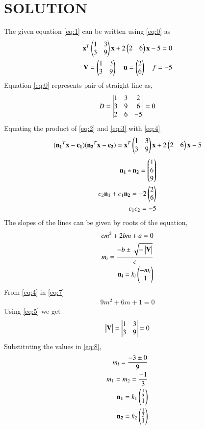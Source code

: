 \documentclass[journal,12pt,twocolumn]{IEEEtran}
\begin{document}
\section{SOLUTION}
The given equation \eqref{eq:1} can be written using \eqref{eq:0} as
\begin{align}
\mathbf{x}^T\begin{pmatrix}1 & 3 \\ 3 & 9\end{pmatrix}\mathbf{x} +2\begin{pmatrix}2 &6\end{pmatrix}\mathbf{x}-5=0\label{eq:4}\\
\mathbf{V} = \begin{pmatrix}1 & 3 \\ 3 & 9\end{pmatrix} \quad \mathbf{u} = \begin{pmatrix}2 \\ 6\end{pmatrix} \quad f= -5 \label{eq:5}
\end{align}
Equation \eqref{eq:0} represents pair of straight line as,
\begin{align}
D = \begin{vmatrix}1&3&2\\3&9&6\\2&6&-5\end{vmatrix} = 0
\end{align}
Equating the product of \eqref{eq:2} and \eqref{eq:3} with \eqref{eq:4}
\begin{align}
(\mathbf{n_1}^T\mathbf{x} -\mathbf{c_1})(\mathbf{n_2}^T\mathbf{x} - \mathbf{c_2})= \mathbf{x}^T\begin{pmatrix}1 & 3 \\ 3 & 9\end{pmatrix}\mathbf{x} +2\begin{pmatrix}2 &6\end{pmatrix}\mathbf{x}-5
\end{align}
\begin{align}
\mathbf{n_1}*\mathbf{n_2}=\begin{pmatrix}1\\6\\9\end{pmatrix}\label{eq:6}\\
c_2\mathbf{n_1}+c_1\mathbf{n_2} = -2\begin{pmatrix}2\\6\end{pmatrix}\\
c_1c_2 = -5
\end{align}
The slopes of the lines can be given by roots of the equation,
\begin{align} 
cm^2+2bm+a=0 \label{eq:7}\\
m_i = \frac{-b\pm \sqrt{-\begin{vmatrix}\mathbf{V}\end{vmatrix}}}{c}\label{eq:8}\\
\mathbf{n_i}=k_i\begin{pmatrix}-m_i\\1\end{pmatrix}
\end{align}
From \eqref{eq:4} in \eqref{eq:7}
\begin{align}
9m^2+6m+1=0
\end{align}
Using \eqref{eq:5} we get
\begin{align}
\begin{vmatrix}\mathbf{V}\end{vmatrix} = \begin{vmatrix}1 & 3\\ 3 & 9\end{vmatrix} = 0
\end{align}
Substituting the values in \eqref{eq:8},
\begin{align}
m_i = \frac{-3\pm 0}{9}\\
m_1= m_2 = \frac{-1}{3} \label{eq:9}\\
\mathbf{n_1}=k_1\begin{pmatrix}\frac{1}{3}\\1\end{pmatrix}\\
\mathbf{n_2}=k_2\begin{pmatrix}\frac{1}{3}\\1\end{pmatrix}
\end{align}
\end{document}
